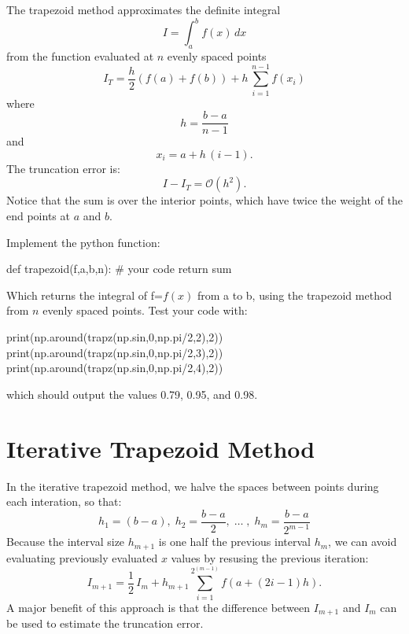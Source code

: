 The trapezoid method approximates the definite integral
\begin{displaymath}
I = \int_a^b f(x) \, dx
\end{displaymath}
from the function evaluated at $n$ evenly spaced points
\begin{displaymath}
I_T =  \frac{h}{2}(f(a) + f(b)) + h \, \sum_{i=1}^{n-1} f(x_i)
\end{displaymath}
where
\begin{displaymath}
h = \frac{b-a}{n-1}
\end{displaymath}
and
\begin{displaymath}
x_i = a + h \, (i - 1).
\end{displaymath}
The truncation error is:
\begin{displaymath}
I-I_T = \mathcal{O}(h^2).
\end{displaymath}
Notice that the sum is over the interior points, which have twice the
weight of the end points at $a$ and $b$.

\plot Implement the python function:
\begin{python}
def trapezoid(f,a,b,n):
   # your code
   return sum
\end{python}
Which returns the integral of f=$f(x)$ from a to b, using the
trapezoid method from $n$ evenly spaced points.
Test your code with:
\begin{python}
print(np.around(trapz(np.sin,0,np.pi/2,2),2))
print(np.around(trapz(np.sin,0,np.pi/2,3),2))
print(np.around(trapz(np.sin,0,np.pi/2,4),2))
\end{python}
which should output the values 0.79, 0.95, and 0.98.

\section{Iterative Trapezoid Method}

In the iterative trapezoid method, we halve the spaces between points during each interation, so that:
\begin{displaymath}
h_1 = (b-a), \; h_2 = \frac{b-a}{2}, \; \ldots \; , \; h_m = \frac{b-a}{2^{m-1}}
\end{displaymath}
Because the interval size $h_{m+1}$ is one half the previous interval
$h_m$, we can avoid evaluating previously evaluated $x$ values by
resusing the previous iteration:
\begin{displaymath}
I_{m+1} = \frac{1}{2} \, I_{m} + h_{m+1}\sum_{i=1}^{2^{(m-1)}} f(a+(2i-1)h).
\end{displaymath}
A major benefit of this approach is that the difference between
$I_{m+1}$ and $I_m$ can be used to estimate the truncation error.\\

